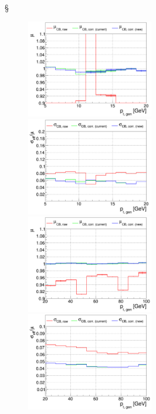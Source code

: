 §\begin{figure}
\includegraphics[width=0.495\textwidth]{./plots_pdf/ECAL_plots/plotsNoPU/EE/pdf/FULL/GENPT/EEFULL_GENPT_0005_0020_MuOverBins.pdf}
\includegraphics[width=0.495\textwidth]{./plots_pdf/ECAL_plots/plotsNoPU/EE/pdf/FULL/GENPT/EEFULL_GENPT_0005_0020_EffSigmaOverBins.pdf}
\includegraphics[width=0.495\textwidth]{./plots_pdf/ECAL_plots/plotsNoPU/EE/pdf/FULL/GENPT/EEFULL_GENPT_0020_0100_MuOverBins.pdf}
\includegraphics[width=0.495\textwidth]{./plots_pdf/ECAL_plots/plotsNoPU/EE/pdf/FULL/GENPT/EEFULL_GENPT_0020_0100_EffSigmaOverBins.pdf}

\end{figure}
